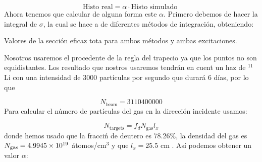 \begin{equation}
	\text{Histo real} =  \alpha \cdot \text{Histo simulado }
\end{equation}
Ahora tenemos que calcular de alguna forma este $\alpha$. Primero debemos de hacer la integral de $\sigma$, la cual se hace a de diferentes métodos de integración, obteniendo: 

\begin{table}[H] \centering
	
	\caption{Valores de la sección eficaz tota para ambos métodos y ambas excitaciones.}
\end{table}
Nosotros usaremos el procedente de la regla del trapecio ya que los puntos no son equidistantes. Los resultado que nostros usaremos tendrán en cuent un haz de $^{11}$Li con una intensidad de 3000 partículas por segundo que durará 6 días, por lo que

\begin{equation}
	N_{\text{beam}} = 3110400000 
\end{equation}
Para calcular el número de partículas del gas en la dirección incidente usamos:

\begin{equation}
	N_{\text{targets}} = f_{d}N_{\text{gas}} l_x
\end{equation}
donde hemos usado que la fracciń de deutero es 78.26\%, la densidad del gas es $N_{\text{gas}}=\num{4.9945E+19}$ átomos/cm$^{3}$ y que $l_x=25.5$ cm \cite{ZIEGLER20101818}. Así podemos obtener un valor $\alpha$:

\begin{equation}
	
\end{equation}